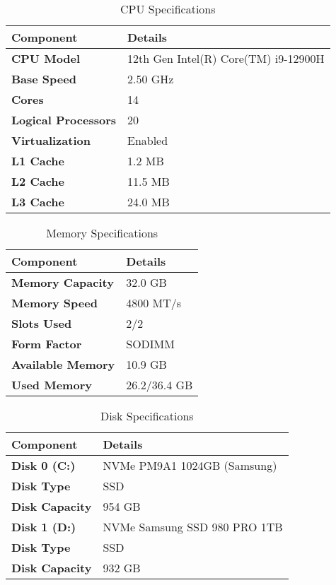 \documentclass[12pt,a4paper,cs4size]{ctexart}
\begin{document}
\begin{table}[h!]
\centering
\captionsetup{labelformat=empty}
\begin{tabular}{|l|l|}
\hline
\textbf{Component} & \textbf{Details} \\ \hline
\textbf{CPU Model} & 12th Gen Intel(R) Core(TM) i9-12900H \\ \hline
\textbf{Base Speed} & 2.50 GHz \\ \hline
\textbf{Cores} & 14 \\ \hline
\textbf{Logical Processors} & 20 \\ \hline
\textbf{Virtualization} & Enabled \\ \hline
\textbf{L1 Cache} & 1.2 MB \\ \hline
\textbf{L2 Cache} & 11.5 MB \\ \hline
\textbf{L3 Cache} & 24.0 MB \\ \hline
\end{tabular}
\caption{CPU Specifications}
\end{table}

\begin{table}[h!]
\centering
\captionsetup{labelformat=empty}
\begin{tabular}{|l|l|}
\hline
\textbf{Component} & \textbf{Details} \\ \hline
\textbf{Memory Capacity} & 32.0 GB \\ \hline
\textbf{Memory Speed} & 4800 MT/s \\ \hline
\textbf{Slots Used} & 2/2 \\ \hline
\textbf{Form Factor} & SODIMM \\ \hline
\textbf{Available Memory} & 10.9 GB \\ \hline
\textbf{Used Memory} & 26.2/36.4 GB \\ \hline
\end{tabular}
\caption{Memory Specifications}
\end{table}

\begin{table}[h!]
\centering
\captionsetup{labelformat=empty}
\begin{tabular}{|l|l|}
\hline
\textbf{Component} & \textbf{Details} \\ \hline
\textbf{Disk 0 (C:)} & NVMe PM9A1 1024GB (Samsung) \\ \hline
\textbf{Disk Type} & SSD \\ \hline
\textbf{Disk Capacity} & 954 GB \\ \hline
\textbf{Disk 1 (D:)} & NVMe Samsung SSD 980 PRO 1TB \\ \hline
\textbf{Disk Type} & SSD \\ \hline
\textbf{Disk Capacity} & 932 GB \\ \hline
\end{tabular}
\caption{Disk Specifications}
\end{table}
\end{document}
